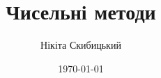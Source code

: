 


\title{Чисельні методи}
\author{Нікіта Скибицький}
\date{\today}



\maketitle

\tableofcontents







